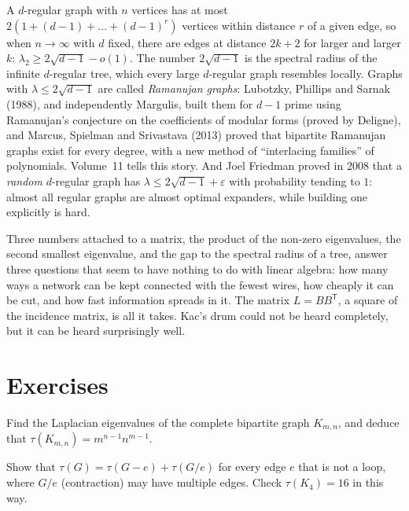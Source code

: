A $d$-regular graph with $n$ vertices has at most $2(1+(d-1)+\dots+(d-1)^r)$ vertices within distance $r$ of a given edge, so when $n\to\infty$ with $d$ fixed, there are edges at distance $2k+2$ for larger
and larger $k$: $\lambda_2\ge2\sqrt{d-1}-o(1)$. The number $2\sqrt{d-1}$ is the spectral radius of the infinite $d$-regular tree, which every large $d$-regular graph resembles locally. Graphs with
$\lambda\le2\sqrt{d-1}$ are called \emph{Ramanujan graphs}: Lubotzky, Phillips and Sarnak (1988), and independently Margulis, built them for $d-1$ prime using Ramanujan's conjecture on the
coefficients of modular forms (proved by Deligne), and Marcus, Spielman and Srivastava (2013) proved that bipartite Ramanujan graphs exist for every degree, with a new method of ``interlacing
families'' of polynomials. Volume~11 tells this story. And Joel Friedman proved in 2008 that a \emph{random} $d$-regular graph has $\lambda\le2\sqrt{d-1}+\varepsilon$ with probability tending to $1$: almost all
regular graphs are almost optimal expanders, while building one explicitly is hard.

\begin{beauty}
Three numbers attached to a matrix, the product of the non-zero eigenvalues, the second smallest eigenvalue, and the gap to the spectral radius of a tree, answer three questions
that seem to have nothing to do with linear algebra: how many ways a network can be kept connected with the fewest wires, how cheaply it can be cut, and how fast information
spreads in it. The matrix $L=BB^{\mathsf T}$, a square of the incidence matrix, is all it takes. Kac's drum could not be heard completely, but it can be heard surprisingly well.
\end{beauty}

\section{Exercises}

\begin{exercise}[$\star$]\label{spectral:ex:kmntrees}
Find the Laplacian eigenvalues of the complete bipartite graph $K_{m,n}$, and deduce that $\tau(K_{m,n})=m^{n-1}n^{m-1}$.
\end{exercise}

\begin{exercise}[$\star$]\label{spectral:ex:delcontrees}
Show that $\tau(G)=\tau(G-e)+\tau(G/e)$ for every edge $e$ that is not a loop, where $G/e$ (contraction) may have multiple edges. Check $\tau(K_4)=16$ in this way.
\end{exercise}

